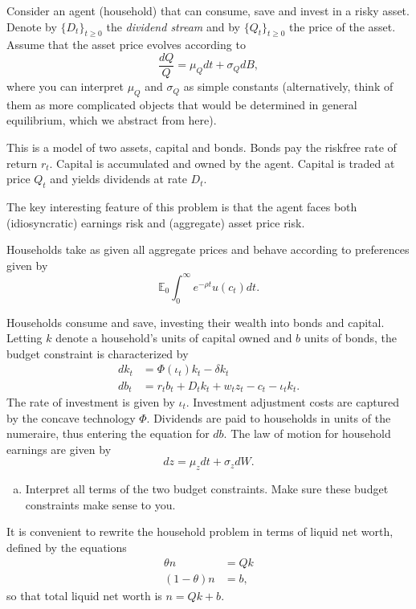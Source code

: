 \documentclass[11pt]{extarticle}
\theoremstyle{plain}
\theoremstyle{definition}
\begin{document}
Consider an agent (household) that can consume, save and invest in a risky asset. Denote by $\{ D_t \}_{t \geq 0}$ the \textit{dividend stream} and by $\{ Q_t \}_{t \geq 0}$ the price of the asset. Assume that the asset price evolves according to 
\begin{equation*}
	\frac{ dQ }{Q} = \mu_Q dt + \sigma_Q dB,
\end{equation*}
where you can interpret $\mu_Q$ and $\sigma_Q$ as simple constants (alternatively, think of them as more complicated objects that would be determined in general equilibrium, which we abstract from here).


This is a model of two assets, capital and bonds. Bonds pay the riskfree rate of return $r_t$. Capital is accumulated and owned by the agent. Capital is traded at price $Q_t$ and yields dividends at rate $D_t$.

The key interesting feature of this problem is that the agent faces both (idiosyncratic) earnings risk and (aggregate) asset price risk.

Households take as given all aggregate prices and behave according to preferences given by
\begin{equation*}
	\mathbb{E}_0 \int_0^\infty e^{- \rho t} u(c_t) dt.
\end{equation*}

Households consume and save, investing their wealth into bonds and capital. Letting $k$ denote a household's units of capital owned and $b$ units of bonds, the budget constraint is characterized by
\begin{align*}
	dk_t &= \Phi(\iota_t) k_t - \delta k_t \\
	db_t &= r_t b_t + D_t k_t + w_t z_t - c_t -  \iota_t k_t.
\end{align*}
The rate of investment is given by $\iota_t$. Investment adjustment costs are captured by the concave technology $\Phi$. Dividends are paid to households in units of the numeraire, thus entering the equation for $db$. The law of motion for household earnings are given by
\begin{equation*}
	dz = \mu_z dt + \sigma_z dW. 
\end{equation*}


\begin{enumerate}[(a)]
\item Interpret all terms of the two budget constraints. Make sure these budget constraints make sense to you.
\end{enumerate}


\vspace{5mm}
\noindent
It is convenient to rewrite the household problem in terms of liquid net worth, defined by the equations 
\begin{align*}
	\theta n &= Q k \\
	(1-\theta) n &= b,
\end{align*}
so that total liquid net worth is $n = Qk + b$.
\end{document}
